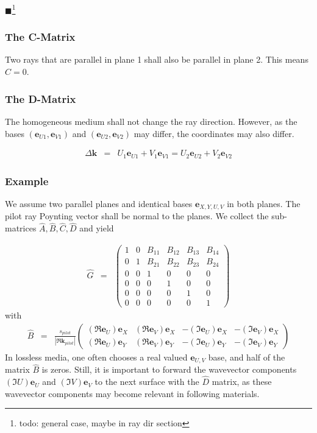 \documentclass[12pt,a4paper,twoside,openright,BCOR10mm,headsepline,titlepage,abstracton,chapterprefix,final]{scrreprt}
\newcommand\Vector[1]{{\mathbf{#1}}}
\newcommand\wavenumber{k}
\newcommand\Wavevector{\Vector{\wavenumber}}
\newcommand{\remark}[1]{{\color{red}$\blacksquare$}\footnote{{\color{red}#1}}}
\begin{document}
\remark{todo: general case, maybe in ray dir section}

\subsubsection{The C-Matrix} 
Two rays that are parallel in plane 1 shall also be parallel in plane 2.
This means $\hat{C} = 0$.

\subsubsection{The D-Matrix}
The homogeneous medium shall not change the ray direction.
However, as the bases $( \Vector{e}_{U1}, \Vector{e}_{V1} )$ and $( \Vector{e}_{U2}, \Vector{e}_{V2} )$
may differ, the coordinates may also differ.

\begin{eqnarray}
 \Delta \Wavevector 
 &=& U_1 \Vector{e}_{U1} + V_1 \Vector{e}_{V1} 
  =  U_2 \Vector{e}_{U2} + V_2 \Vector{e}_{V2}
\end{eqnarray}

\subsubsection{Example}
We assume two parallel planes and identical bases $\Vector{e}_{X,Y,U,V}$ in both planes. 
The pilot ray Poynting vector shall be normal to the planes.
We collect the sub-matrices $\hat{A}, \hat{B}, \hat{C}, \hat{D}$ and yield

\begin{eqnarray}
 \hat{G} &=&
 \begin{pmatrix}
  1 & 0 & B_{11} & B_{12} & B_{13} & B_{14} \\
  0 & 1 & B_{21} & B_{22} & B_{23} & B_{24} \\
  0 & 0 & 1 & 0 & 0 & 0 \\
  0 & 0 & 0 & 1 & 0 & 0 \\
  0 & 0 & 0 & 0 & 1 & 0 \\
  0 & 0 & 0 & 0 & 0 & 1  
 \end{pmatrix}
 \label{eq:xyuv_propagation_homogeneous}
\end{eqnarray}
with\begin{eqnarray}
 \hat{B} &=&
 \frac{ s_{pilot} }{| \Re \Wavevector_{pilot} |}
 \begin{pmatrix}
  (\Re \Vector{e}_U) \Vector{e}_X & (\Re \Vector{e}_V) \Vector{e}_X & -(\Im \Vector{e}_U) \Vector{e}_X & -(\Im \Vector{e}_V) \Vector{e}_X \\
  (\Re \Vector{e}_U) \Vector{e}_Y & (\Re \Vector{e}_V) \Vector{e}_Y & -(\Im \Vector{e}_U) \Vector{e}_Y & -(\Im \Vector{e}_V) \Vector{e}_Y
 \end{pmatrix}
\end{eqnarray}
In lossless media, one often chooses a real valued $\Vector{e}_{U,V}$ base,
and half of the matrix $\hat{B}$ is zeros.
Still, it is important to forward the wavevector components 
$(\Im U) \Vector{e}_U$ and $(\Im V) \Vector{e}_V$
to the next surface with the $\hat{D}$ matrix, 
as these wavevector components may become relevant in following materials.
\end{document}
